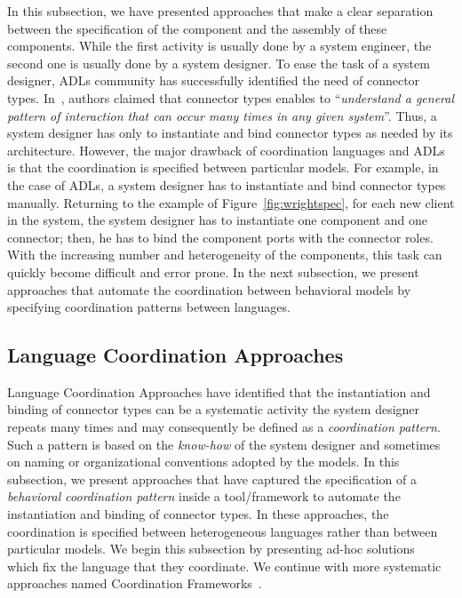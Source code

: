 In this subsection, we have presented approaches that make a clear separation between the specification of the component and the assembly of these components. While the first activity is usually done by a system engineer, the second one is usually done by a system designer. To ease the task of a system designer, ADLs community has successfully identified the need of connector types. In~\cite{wrightbib}, authors claimed that connector types enables to ``\emph{understand a general pattern of interaction that can occur many times in any given system}''. Thus, a system designer has only to instantiate and bind connector types as needed by its architecture. However, the major drawback of coordination languages and ADLs is that the coordination is specified between particular models. For example, in the case of ADLs, a system designer has to instantiate and bind connector types manually. Returning to the example of Figure~\ref{fig:wrightspec}, for each new client in the system, the system designer has to instantiate one component and one connector; then, he has to bind the component ports with the connector roles. With the increasing number and heterogeneity of the components, this task can quickly become difficult and error prone. In the next subsection, we present approaches that automate the coordination between behavioral models by specifying coordination patterns between languages.

\subsection{Language Coordination Approaches}
Language Coordination Approaches have identified that the instantiation and binding of connector types can be a systematic activity the system designer repeats many times and may consequently be defined as a \emph{coordination pattern}. Such a pattern is based on the \emph{know-how} of the system designer and sometimes on naming or organizational conventions adopted by the models. In this subsection, we present approaches that have captured the specification of a \emph{behavioral coordination pattern} inside a tool/framework to automate the instantiation and binding of connector types. In these approaches, the coordination is specified between heterogeneous languages rather than between particular models. We begin this subsection by presenting ad-hoc solutions~\cite{mascotbib, dinatale} which fix the language that they coordinate. We continue with more systematic approaches named Coordination Frameworks~\cite{modhelxbib,ptoleframebib}.


